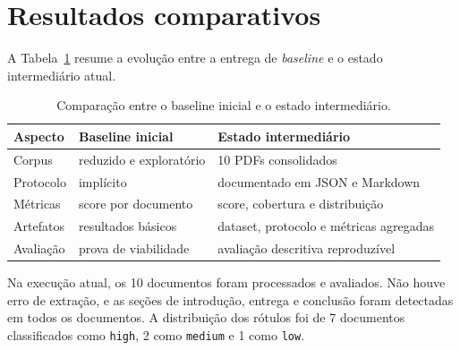 \documentclass[12pt]{article}
\begin{document}
\section{Resultados comparativos}

A Tabela~\ref{tab:comparacao_geral} resume a evolução entre a entrega de \textit{baseline} e o estado intermediário atual.

\begin{table}[h]
    \centering
    \begin{tabular}{lll}
        \toprule
        Aspecto & Baseline inicial & Estado intermediário \\
        \midrule
        Corpus & reduzido e exploratório & 10 PDFs consolidados \\
        Protocolo & implícito & documentado em JSON e Markdown \\
        Métricas & score por documento & score, cobertura e distribuição \\
        Artefatos & resultados básicos & dataset, protocolo e métricas agregadas \\
        Avaliação & prova de viabilidade & avaliação descritiva reproduzível \\
        \bottomrule
    \end{tabular}
    \caption{Comparação entre o baseline inicial e o estado intermediário.}
    \label{tab:comparacao_geral}
\end{table}

Na execução atual, os 10 documentos foram processados e avaliados. Não houve erro de extração, e as seções de introdução, entrega e conclusão foram detectadas em todos os documentos. A distribuição dos rótulos foi de 7 documentos classificados como \texttt{high}, 2 como \texttt{medium} e 1 como \texttt{low}.
\end{document}
